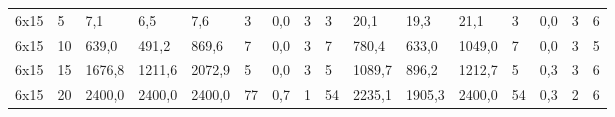 \begin{table}[]
\begin{tabular}{llllllllllllllll}
		6x15    & 5      & 7,1                                                 & 6,5                                                 & 7,6                                                 & 3                                                   & 0,0                                                 & 3      & 3                                                         & 20,1                                                & 19,3                                                & 21,1                                                & 3                                                   & 0,0                                                 & 3      & 6                                                         \\
		6x15    & 10     & 639,0                                               & 491,2                                               & 869,6                                               & 7                                                   & 0,0                                                 & 3      & 7                                                         & 780,4                                               & 633,0                                               & 1049,0                                              & 7                                                   & 0,0                                                 & 3      & 5                                                         \\
		6x15    & 15     & 1676,8                                              & 1211,6                                              & 2072,9                                              & 5                                                   & 0,0                                                 & 3      & 5                                                         & 1089,7                                              & 896,2                                               & 1212,7                                              & 5                                                   & 0,3                                                 & 3      & 6                                                         \\
		6x15    & 20     & 2400,0                                              & 2400,0                                              & 2400,0                                              & 77                                                  & 0,7                                                 & 1      & 54                                                        & 2235,1                                              & 1905,3                                              & 2400,0                                              & 54                                                  & 0,3                                                 & 2      & 6                                                         \\

\end{tabular}
\end{table}
